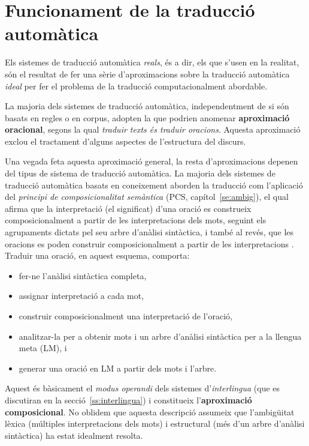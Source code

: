 \section{Funcionament de la traducció automàtica}
\label{se:aprox}

Els sistemes de traducció automàtica \emph{reals}, és a dir, els que
s'usen en la realitat, són el resultat de fer una sèrie
d'aproximacions sobre la traducció automàtica \emph{ideal} per fer el
problema de la traducció computacionalment abordable.

La majoria dels sistemes de traducció automàtica, independentment de
si són basats en regles o en corpus, adopten la que podrien anomenar
\textbf{aproximació oracional}, segons la qual \emph{traduir texts és
  traduir oracions}. Aquesta aproximació exclou el tractament d'alguns
aspectes de l'estructura del discurs.

Una vegada feta aquesta aproximació general, la resta d'aproximacions
depenen del tipus de sistema de traducció automàtica. La majoria dels
sistemes de traducció automàtica basats en coneixement aborden la
traducció com l'aplicació del \emph{principi de composicionalitat
  semàntica} (PCS, capítol~\ref{se:ambig}), el qual afirma que la
interpretació (el significat) d'una oració es construeix
composicionalment a partir de les interpretacions dels mots, seguint
els agrupaments dictats pel seu arbre d'anàlisi sintàctica, i també al
revés, que les oracions es poden construir composicionalment a partir
de les interpretacions \citep{tellier00p}. Traduir una oració, en
aquest esquema, comporta:
\begin{itemize}
\item fer-ne l'anàlisi sintàctica completa,
\item assignar interpretació a cada mot,
\item construir composicionalment una interpretació de l'oració,
\item analitzar-la per a obtenir mots i un arbre d'anàlisi sintàctica
  per a la llengua meta (LM), i
\item generar una oració en LM a partir dels mots i l'arbre.
\end{itemize}
Aquest és bàsicament el \emph{modus operandi} dels sistemes
d'\emph{interlingua} (que es discutiran en la
secció~\ref{ss:interlingua}) i constitueix l'\textbf{aproximació
  composicional}. No oblidem que aquesta descripció assumeix que
l'ambigüitat lèxica (múltiples interpretacions dels mots) i
estructural (més d'un arbre d'anàlisi sintàctica) ha estat idealment
resolta.

